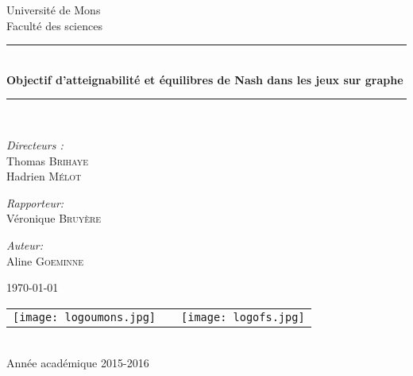\documentclass[]{article}
\begin{document}
\begin{titlepage}
\begin{center}

{\Large Université de Mons}\\[1ex]
{\Large Faculté des sciences}\\[2.5cm]

\newcommand{\HRule}{\rule{\linewidth}{0.3mm}}
\HRule \\[0.3cm]
{ \LARGE \bfseries Objectif d'atteignabilité et équilibres de Nash dans les jeux sur graphe \\[0.3cm]}
\HRule \\[1.5cm]


\begin{center}
	\emph{Directeurs :}\\
	 Thomas \textsc{Brihaye} \\
	 Hadrien \textsc{Mélot}

\end{center}

\begin{center}
	\emph{Rapporteur:}\\
	Véronique \textsc{Bruyère}
\end{center}

\begin{center}
\emph{Auteur:} \\
Aline \textsc{Goeminne}
\end{center}
\vfill
\today
\vfill

\begin{center}
\begin{tabular}[t]{c c c}
\texttt{[image: logoumons.jpg]} &
\hspace{0.3cm} &
\texttt{[image: logofs.jpg]}
\end{tabular}
\end{center}~\\

{\large Année académique 2015-2016}

\end{center}
\end{titlepage}

\newpage \thispagestyle{empty}
\null
\end{document}
